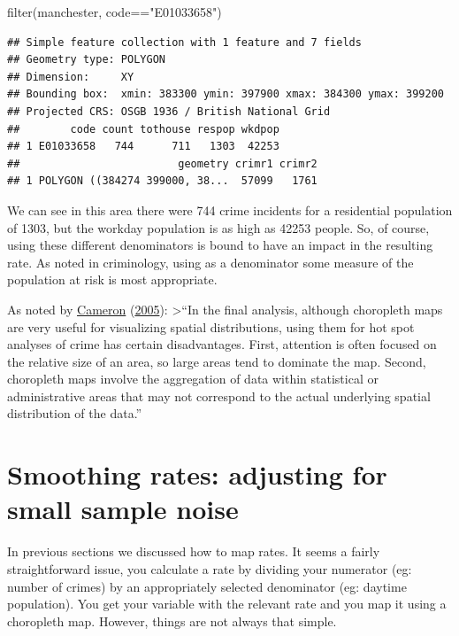 \documentclass[
  krantz2]{krantz}
\makeatletter
\newenvironment{Shaded}{\begin{snugshade}}{\end{snugshade}}
\newcommand{\FunctionTok}[1]{\textcolor[rgb]{0,0,0}{#1}}
\newcommand{\NormalTok}[1]{#1}
\newcommand{\SpecialCharTok}[1]{\textcolor[rgb]{0,0,0}{#1}}
\newcommand{\StringTok}[1]{\textcolor[rgb]{0.5,0.5,0.5}{#1}}
\newenvironment{kframe}{%
\medskip{}
\setlength{\fboxsep}{.8em}
 \def\at@end@of@kframe{}%
 \ifinner\ifhmode%
  \def\at@end@of@kframe{\end{minipage}}%
  \begin{minipage}{\columnwidth}%
 \fi\fi%
 \def\FrameCommand##1{\hskip\@totalleftmargin \hskip-\fboxsep
 \colorbox{shadecolor}{##1}\hskip-\fboxsep
     \hskip-\linewidth \hskip-\@totalleftmargin \hskip\columnwidth}%
 \MakeFramed {\advance\hsize-\width
   \@totalleftmargin\z@ \linewidth\hsize
   \@setminipage}}%
 {\par\unskip\endMakeFramed%
 \at@end@of@kframe}
\renewenvironment{Shaded}{\begin{kframe}}{\end{kframe}}
\makeatother
\begin{document}
\begin{Shaded}
\begin{Highlighting}[]
\FunctionTok{filter}\NormalTok{(manchester, code}\SpecialCharTok{==}\StringTok{"E01033658"}\NormalTok{)}
\end{Highlighting}
\end{Shaded}

\begin{verbatim}
## Simple feature collection with 1 feature and 7 fields
## Geometry type: POLYGON
## Dimension:     XY
## Bounding box:  xmin: 383300 ymin: 397900 xmax: 384300 ymax: 399200
## Projected CRS: OSGB 1936 / British National Grid
##        code count tothouse respop wkdpop
## 1 E01033658   744      711   1303  42253
##                         geometry crimr1 crimr2
## 1 POLYGON ((384274 399000, 38...  57099   1761
\end{verbatim}

We can see in this area there were 744 crime incidents for a residential population of 1303, but the workday population is as high as 42253 people. So, of course, using these different denominators is bound to have an impact in the resulting rate. As noted in criminology, using as a denominator some measure of the population at risk is most appropriate.

As noted by \protect\hyperlink{ref-Cameron_2005}{Cameron} (\protect\hyperlink{ref-Cameron_2005}{2005}):
\textgreater{}``In the final analysis, although choropleth maps are very useful for visualizing spatial distributions, using them for hot spot analyses of crime has certain disadvantages. First, attention is often focused on the relative size of an area, so large areas tend to dominate the map. Second, choropleth maps involve the aggregation of data within statistical or administrative areas that may not correspond to the actual underlying spatial distribution of the data.''

\hypertarget{smoothing-rates-adjusting-for-small-sample-noise}{%
\section{Smoothing rates: adjusting for small sample noise}\label{smoothing-rates-adjusting-for-small-sample-noise}}

In previous sections we discussed how to map rates. It seems a fairly straightforward issue, you calculate a rate by dividing your numerator (eg: number of crimes) by an appropriately selected denominator (eg: daytime population). You get your variable with the relevant rate and you map it using a choropleth map. However, things are not always that simple.
\end{document}
